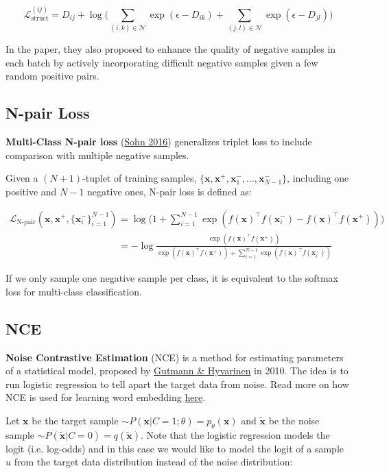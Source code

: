 \documentclass[12pt]{article}
\begin{document}
\[
\mathcal{L}_\text{struct}^{(ij)} = D_{ij} + \log \Big( \sum_{(i,k)\in\mathcal{N}} \exp(\epsilon - D_{ik}) + \sum_{(j,l)\in\mathcal{N}} \exp(\epsilon - D_{jl}) \Big)
\]

In the paper, they also proposed to enhance the quality of negative samples in each batch by actively incorporating difficult negative samples given a few random positive pairs.

\subsection{N-pair Loss}

\textbf{Multi-Class N-pair loss} (\href{https://papers.nips.cc/paper/2016/hash/6b180037abbebea991d8b1232f8a8ca9-Abstract.html}{Sohn 2016}) generalizes triplet loss to include comparison with multiple negative samples.

Given a $(N + 1)$-tuplet of training samples, $\{ \mathbf{x}, \mathbf{x}^+, \mathbf{x}^-_1, \dots, \mathbf{x}^-_{N-1} \}$, including one positive and $N-1$ negative ones, N-pair loss is defined as:

\[
\begin{aligned}
\mathcal{L}_\text{N-pair}(\mathbf{x}, \mathbf{x}^+, \{\mathbf{x}^-_i\}^{N-1}_{i=1}) 
&= \log\big(1 + \sum_{i=1}^{N-1} \exp(f(\mathbf{x})^\top f(\mathbf{x}^-_i) - f(\mathbf{x})^\top f(\mathbf{x}^+))\big) \\
&= -\log\frac{\exp(f(\mathbf{x})^\top f(\mathbf{x}^+))}{\exp(f(\mathbf{x})^\top f(\mathbf{x}^+)) + \sum_{i=1}^{N-1} \exp(f(\mathbf{x})^\top f(\mathbf{x}^-_i))}
\end{aligned}
\]

If we only sample one negative sample per class, it is equivalent to the softmax loss for multi-class classification.

\subsection{NCE}

\textbf{Noise Contrastive Estimation} (NCE) is a method for estimating parameters of a statistical model, proposed by \href{http://proceedings.mlr.press/v9/gutmann10a.html}{Gutmann \& Hyvarinen} in 2010. The idea is to run logistic regression to tell apart the target data from noise. Read more on how NCE is used for learning word embedding \href{https://lilianweng.github.io/posts/2017-10-15-word-embedding/#noise-contrastive-estimation-nce}{here}.

Let $\mathbf{x}$ be the target sample $\sim P(\mathbf{x} \vert C=1; \theta) = p_\theta(\mathbf{x})$ and $\tilde{\mathbf{x}}$ be the noise sample $\sim  P(\tilde{\mathbf{x}} \vert C=0) = q(\tilde{\mathbf{x}})$. Note that the logistic regression models the logit (i.e. log-odds) and in this case we would like to model the logit of a sample $u$ from the target data distribution instead of the noise distribution:
\end{document}
